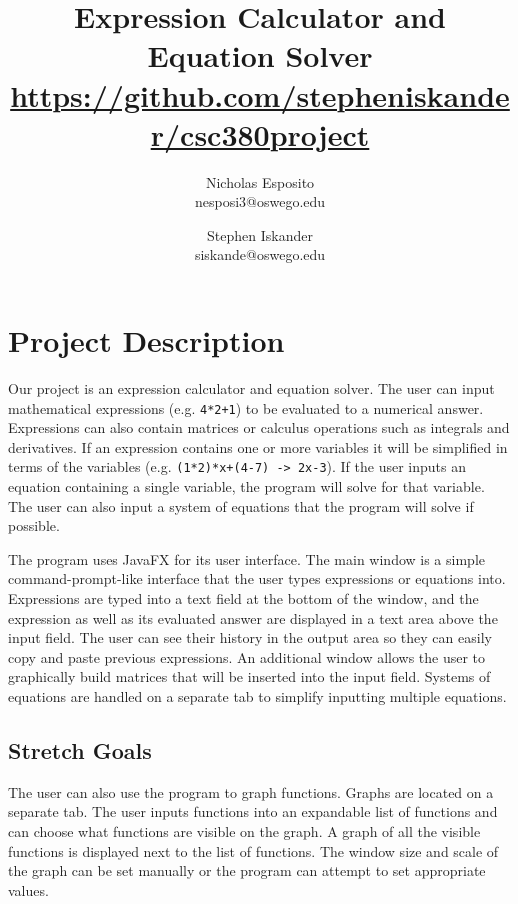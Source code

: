 \documentclass[11pt]{article}
\newcommand{\code}[1]{\texttt{#1}}
\begin{document}
\title{\textbf{Expression Calculator and Equation Solver} \\
    \url{https://github.com/stepheniskander/csc380project}}
\author{Nicholas Esposito \\ nesposi3@oswego.edu \and Stephen Iskander \\ siskande@oswego.edu}

\maketitle

\section{Project Description}
Our project is an expression calculator and equation solver.
The user can input mathematical expressions (e.g. \code{4*2+1}) to be evaluated to a numerical answer.
Expressions can also contain matrices or calculus operations such as integrals and derivatives.
If an expression contains one or more variables it will be simplified in terms of the variables (e.g. \code{(1*2)*x+(4-7) -> 2x-3}).
If the user inputs an equation containing a single variable, the program will solve for that variable.
The user can also input a system of equations that the program will solve if possible.

\par The program uses JavaFX for its user interface.
The main window is a simple command-prompt-like interface that the user types expressions or equations into.
Expressions are typed into a text field at the bottom of the window, and the expression as well as its evaluated answer are displayed in a text area above the input field.
The user can see their history in the output area so they can easily copy and paste previous expressions.
An additional window allows the user to graphically build matrices that will be inserted into the input field.
Systems of equations are handled on a separate tab to simplify inputting multiple equations.

\subsection{Stretch Goals}
The user can also use the program to graph functions.
Graphs are located on a separate tab.
The user inputs functions into an expandable list of functions and can choose what functions are visible on the graph.
A graph of all the visible functions is displayed next to the list of functions.
The window size and scale of the graph can be set manually or the program can attempt to set appropriate values.
\end{document}
